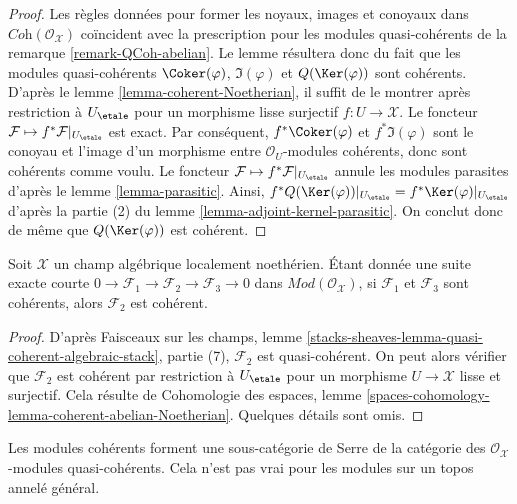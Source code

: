\begin{proof}
Les règles données pour former les noyaux, images et conoyaux dans
$\textit{Coh}(\mathcal{O}_\mathcal{X})$ coïncident avec la prescription
pour les modules quasi-cohérents de la remarque \ref{remark-QCoh-abelian}.
Le lemme résultera donc du fait que les modules quasi-cohérents
$\Coker(\varphi)$, $\Im(\varphi)$ et $Q(\Ker(\varphi))$ sont cohérents.
D'après le lemme \ref{lemma-coherent-Noetherian}, il suffit de le montrer après
restriction à $U_\etale$ pour un morphisme lisse surjectif
$f : U \to \mathcal{X}$. Le foncteur
$\mathcal{F} \mapsto f^*\mathcal{F}|_{U_\etale}$
est exact. Par conséquent, $f^*\Coker(\varphi)$ et $f^*\Im(\varphi)$ sont
le conoyau et l'image d'un morphisme entre $\mathcal{O}_U$-modules cohérents,
donc sont cohérents comme voulu. Le foncteur
$\mathcal{F} \mapsto f^*\mathcal{F}|_{U_\etale}$
annule les modules parasites d'après le lemme \ref{lemma-parasitic}.
Ainsi, $f^*Q(\Ker(\varphi))|_{U_\etale} = f^*\Ker(\varphi)|_{U_\etale}$
d'après la partie (2) du lemme \ref{lemma-adjoint-kernel-parasitic}.
On conclut donc de même que $Q(\Ker(\varphi))$ est cohérent.
\end{proof}

\begin{lemma}
\label{lemma-extension-coherent}
Soit $\mathcal{X}$ un champ algébrique localement noethérien.
Étant donnée une suite exacte courte
$0 \to \mathcal{F}_1 \to \mathcal{F}_2 \to \mathcal{F}_3 \to 0$
dans $\textit{Mod}(\mathcal{O}_\mathcal{X})$,
si $\mathcal{F}_1$ et $\mathcal{F}_3$ sont cohérents, alors
$\mathcal{F}_2$ est cohérent.
\end{lemma}

\begin{proof}
D'après Faisceaux sur les champs, lemme
\ref{stacks-sheaves-lemma-quasi-coherent-algebraic-stack}, partie (7),
$\mathcal{F}_2$ est quasi-cohérent. On peut alors vérifier que
$\mathcal{F}_2$ est cohérent par restriction à $U_\etale$
pour un morphisme $U \to \mathcal{X}$ lisse et surjectif.
Cela résulte de Cohomologie des espaces, lemme
\ref{spaces-cohomology-lemma-coherent-abelian-Noetherian}.
Quelques détails sont omis.
\end{proof}

\noindent
Les modules cohérents forment une sous-catégorie de Serre de la
catégorie des $\mathcal{O}_\mathcal{X}$-modules quasi-cohérents.
Cela n'est pas vrai pour les modules sur un topos annelé général.

